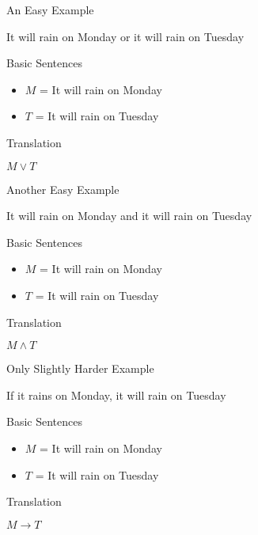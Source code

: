 \documentclass[
  ignorenonframetext,
]{beamer}
\providecommand{\tightlist}{%
  \setlength{\itemsep}{0pt}\setlength{\parskip}{0pt}}
\renewcommand{\,}{\text{, }}
\renewenvironment*{quote}	
	{\list{}{\rightmargin   \leftmargin} \item } 	
	{\endlist }
\begin{document}
\begin{frame}{An Easy Example}
\protect\hypertarget{an-easy-example}{}
\begin{quote}
It will rain on Monday or it will rain on Tuesday
\end{quote}

Basic Sentences

\begin{itemize}
\tightlist
\item
  \(M\) = It will rain on Monday
\item
  \(T\) = It will rain on Tuesday
\end{itemize}

Translation

\begin{quote}
\(M \vee T\)
\end{quote}
\end{frame}

\begin{frame}{Another Easy Example}
\protect\hypertarget{another-easy-example}{}
\begin{quote}
It will rain on Monday and it will rain on Tuesday
\end{quote}

Basic Sentences

\begin{itemize}
\tightlist
\item
  \(M\) = It will rain on Monday
\item
  \(T\) = It will rain on Tuesday
\end{itemize}

Translation

\begin{quote}
\(M \wedge T\)
\end{quote}
\end{frame}

\begin{frame}{Only Slightly Harder Example}
\protect\hypertarget{only-slightly-harder-example}{}
\begin{quote}
If it rains on Monday, it will rain on Tuesday
\end{quote}

Basic Sentences

\begin{itemize}
\tightlist
\item
  \(M\) = It will rain on Monday
\item
  \(T\) = It will rain on Tuesday
\end{itemize}

Translation

\begin{quote}
\(M \rightarrow T\)
\end{quote}
\end{frame}
\end{document}
